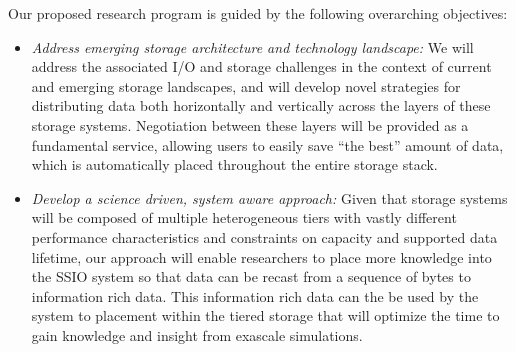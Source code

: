 % 
Our proposed research program is guided by the following overarching objectives:
\begin{itemize}
\item
{\em Address emerging storage architecture and technology landscape:}
We will address the associated I/O and storage challenges in the context of
current and emerging storage landscapes,
and will develop novel strategies for distributing 
data both horizontally and vertically across the layers of these storage systems.  
Negotiation between these layers will be provided as a fundamental service, allowing users to
easily save ``the best'' amount of data, which is automatically placed throughout the
entire storage stack.
\item
{\em Develop a science driven, system aware approach:}
%
Given that storage systems will be composed of multiple heterogeneous tiers with
vastly different performance characteristics and constraints on capacity and 
supported data lifetime, our approach will enable researchers to 
place more knowledge into the SSIO system so that data can be recast from 
a sequence of bytes to information rich data. This information rich data can the
be used by the system to placement within the tiered storage that will optimize the time
to gain knowledge and insight from exascale simulations.



\end{itemize}
